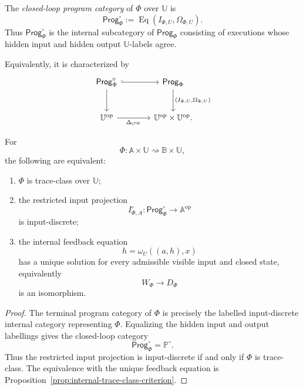 \begin{definition}
\label{def:closed-loop-program-category}
The \emph{closed-loop program category} of \(\Phi\) over \(\mathbb U\) is
\[
\mathsf{Prog}^{\circ}_{\Phi}
:=
\operatorname{Eq}(I_{\Phi,U},\Omega_{\Phi,U}).
\]
Thus \(\mathsf{Prog}^{\circ}_{\Phi}\) is the internal subcategory of
\(\mathsf{Prog}_\Phi\) consisting of executions whose hidden input and hidden
output \(\mathbb U\)-labels agree.
\end{definition}

Equivalently, it is characterized by
\[
\begin{tikzcd}[column sep=large,row sep=large]
\mathsf{Prog}^{\circ}_{\Phi}
  \arrow[r, hook]
  \arrow[d]
&
\mathsf{Prog}_{\Phi}
  \arrow[d, "{(I_{\Phi,U},\Omega_{\Phi,U})}"]
\\
\mathbb U^{\mathrm{op}}
  \arrow[r, "\Delta_{\mathbb U^{\mathrm{op}}}"']
&
\mathbb U^{\mathrm{op}}\times\mathbb U^{\mathrm{op}} .
\end{tikzcd}
\]

\begin{proposition}
\label{prop:dynamic-trace-class-criterion}
For
\[
\Phi:
\mathbb A\times\mathbb U
\rightsquigarrow
\mathbb B\times\mathbb U,
\]
the following are equivalent:
\begin{enumerate}
\item \(\Phi\) is trace-class over \(\mathbb U\);
\item the restricted input projection
\[
I_{\Phi,A}^{\circ}:
\mathsf{Prog}^{\circ}_{\Phi}
\to
\mathbb A^{\mathrm{op}}
\]
is input-discrete;
\item the internal feedback equation
\[
h=\omega_U((a,h),x)
\]
has a unique solution for every admissible visible input and closed state,
equivalently
\[
W_\Phi\to D_\Phi
\]
is an isomorphism.
\end{enumerate}
\end{proposition}

\begin{proof}
The terminal program category of \(\Phi\) is precisely the labelled
input-discrete internal category representing \(\Phi\).  Equalizing the hidden
input and output labellings gives the closed-loop category
\[
\mathsf{Prog}^{\circ}_{\Phi}
=
\mathbb P^\circ.
\]
Thus the restricted input projection is input-discrete if and only if
\(\Phi\) is trace-class.  The equivalence with the unique feedback equation is
Proposition~\ref{prop:internal-trace-class-criterion}.
\end{proof}

